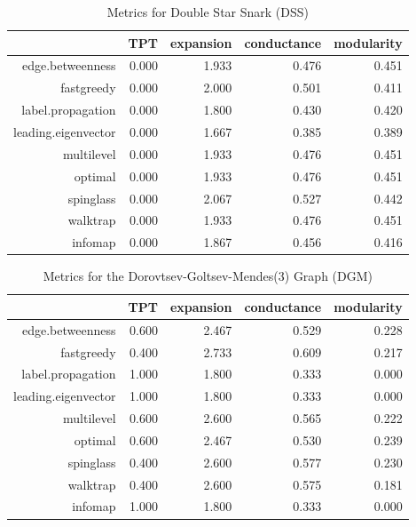 \documentclass[paper=a4, fontsize=11pt]{scrartcl} %
\begin{document}
\begin{table}[ht]
\centering
\begin{tabular}{rrrrr}
  \hline
 & TPT & expansion & conductance & modularity \\ 
  \hline
edge.betweenness & 0.000 & 1.933 & 0.476 & 0.451 \\ 
  
             fastgreedy & 0.000 & 2.000 & 0.501 & 0.411 \\ 
  
             label.propagation & 0.000 & 1.800 & 0.430 & 0.420 \\ 
  
             leading.eigenvector & 0.000 & 1.667 & 0.385 & 0.389 \\ 
  
             multilevel & 0.000 & 1.933 & 0.476 & 0.451 \\ 
  
             optimal & 0.000 & 1.933 & 0.476 & 0.451 \\ 
  
             spinglass & 0.000 & 2.067 & 0.527 & 0.442 \\ 
  
             walktrap & 0.000 & 1.933 & 0.476 & 0.451 \\ 
  
             infomap & 0.000 & 1.867 & 0.456 & 0.416 \\ 
   \hline
\end{tabular}
\caption{Metrics for Double Star Snark (DSS)} 
\end{table}
\begin{table}[ht]
\centering
\begin{tabular}{rrrrr}
  \hline
 & TPT & expansion & conductance & modularity \\ 
  \hline
edge.betweenness & 0.600 & 2.467 & 0.529 & 0.228 \\ 
  
             fastgreedy & 0.400 & 2.733 & 0.609 & 0.217 \\ 
  
             label.propagation & 1.000 & 1.800 & 0.333 & 0.000 \\ 
  
             leading.eigenvector & 1.000 & 1.800 & 0.333 & 0.000 \\ 
  
             multilevel & 0.600 & 2.600 & 0.565 & 0.222 \\ 
  
             optimal & 0.600 & 2.467 & 0.530 & 0.239 \\ 
  
             spinglass & 0.400 & 2.600 & 0.577 & 0.230 \\ 
  
             walktrap & 0.400 & 2.600 & 0.575 & 0.181 \\ 
  
             infomap & 1.000 & 1.800 & 0.333 & 0.000 \\ 
   \hline
\end{tabular}
\caption{Metrics for the Dorovtsev-Goltsev-Mendes(3) Graph (DGM)} 
\end{table}
\end{document}
